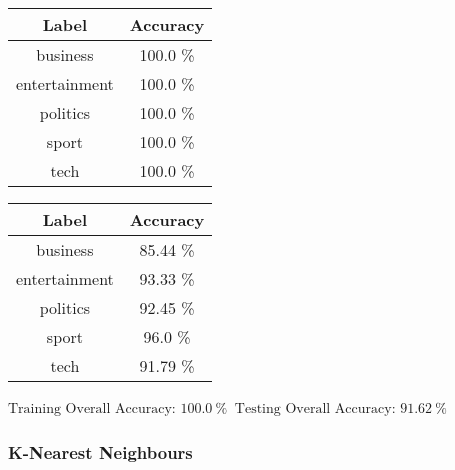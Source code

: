 \documentclass[8pt]{extarticle}
\begin{document}
    \begin{center}
        \begin{tabular}{cc}
            \hline
            Label & Accuracy\\
            \hline
            business &   100.0 \% \\
       entertainment &   100.0 \% \\
           politics  &   100.0 \% \\
              sport  &   100.0 \% \\
               tech  &   100.0 \%
         \end{tabular}
         \quad
        \begin{tabular}{cc}
            \hline
            Label & Accuracy\\
            \hline
            business &   85.44 \% \\
        entertainment &  93.33 \% \\
           politics  &   92.45 \% \\
              sport  &   96.0  \% \\
               tech  &   91.79 \%
        \end{tabular}
    \end{center}
    \begin{center}
        $\displaystyle \text{Training Overall Accuracy:\ }100.0\ \%$
        $\displaystyle \ \text{Testing Overall Accuracy:\ }91.62\ \%$
    \end{center}
    \hypertarget{k-nearest-neighbours}{%
\subsubsection{K-Nearest Neighbours}\label{k-nearest-neighbours}}
\end{document}
